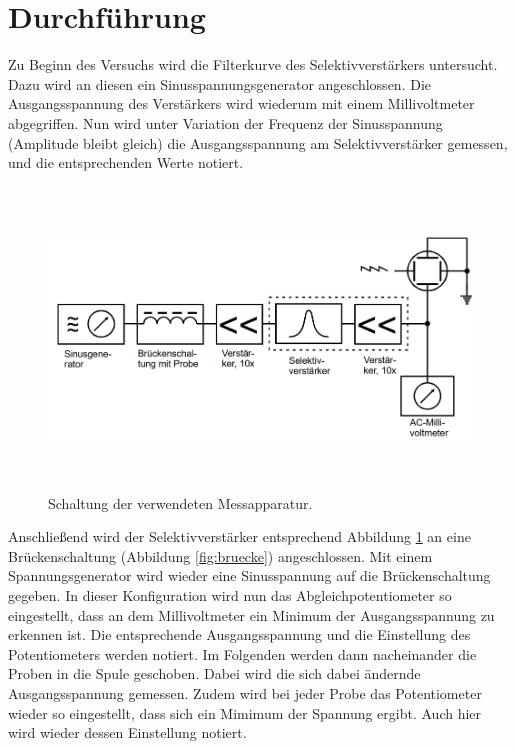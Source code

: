 \section{Durchführung}
\label{sec:Durchführung}
Zu Beginn des Versuchs wird die Filterkurve des Selektivverstärkers untersucht.
Dazu wird an diesen ein Sinusspannungsgenerator angeschlossen. Die Ausgangsspannung
des Verstärkers wird wiederum mit einem Millivoltmeter abgegriffen. Nun wird unter
Variation der Frequenz der Sinusspannung (Amplitude bleibt gleich) die Ausgangsspannung
am Selektivverstärker gemessen, und die entsprechenden Werte notiert.

\begin{figure}[H]
  \centering
  \includegraphics[height=8cm]{Schaltung.PNG}
  \caption{Schaltung der verwendeten Messapparatur. \cite{sample}}
  \label{fig:Schaltung}
\end{figure}

Anschließend wird der Selektivverstärker entsprechend Abbildung \ref{fig:Schaltung}
an eine Brückenschaltung (Abbildung \ref{fig:bruecke}) angeschlossen. Mit einem
Spannungsgenerator wird wieder eine Sinusspannung auf die Brückenschaltung gegeben.
In dieser Konfiguration wird nun das Abgleichpotentiometer so eingestellt, dass an
dem Millivoltmeter ein Minimum der Ausgangsspannung zu erkennen ist. Die entsprechende
Ausgangsspannung und die Einstellung des Potentiometers werden notiert. Im Folgenden werden dann nacheinander die Proben in
die Spule geschoben. Dabei wird die sich dabei ändernde Ausgangsspannung gemessen.
Zudem wird bei jeder Probe das Potentiometer wieder so eingestellt, dass sich ein
Mimimum der Spannung ergibt. Auch hier wird wieder dessen Einstellung notiert.
